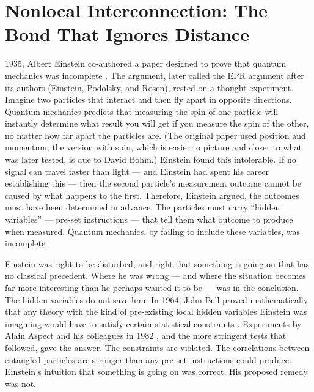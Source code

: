 \chapter[Nonlocal Interconnection]{Nonlocal Interconnection: The Bond That Ignores Distance}
\label{ch:nonlocal-interconnection}


 1935, Albert Einstein co-authored a paper designed to prove that quantum mechanics was incomplete \citep{Einstein1935EPR}. The argument, later called the EPR argument after its authors (Einstein, Podolsky, and Rosen), rested on a thought experiment. Imagine two particles that interact and then fly apart in opposite directions. Quantum mechanics predicts that measuring the spin of one particle will instantly determine what result you will get if you measure the spin of the other, no matter how far apart the particles are. (The original paper used position and momentum; the version with spin, which is easier to picture and closer to what was later tested, is due to David Bohm.) Einstein found this intolerable. If no signal can travel faster than light --- and Einstein had spent his career establishing this --- then the second particle's measurement outcome cannot be caused by what happens to the first. Therefore, Einstein argued, the outcomes must have been determined in advance. The particles must carry ``hidden variables'' --- pre-set instructions --- that tell them what outcome to produce when measured. Quantum mechanics, by failing to include these variables, was incomplete.

Einstein was right to be disturbed, and right that something is going on that has no classical precedent. Where he was wrong --- and where the situation becomes far more interesting than he perhaps wanted it to be --- was in the conclusion. The hidden variables do not save him. In 1964, John Bell proved mathematically that any theory with the kind of pre-existing local hidden variables Einstein was imagining would have to satisfy certain statistical constraints \citep{Bell1964}. Experiments by Alain Aspect and his colleagues in 1982 \citep{Aspect1982}, and the more stringent tests that followed, gave the answer. The constraints are violated. The correlations between entangled particles are stronger than any pre-set instructions could produce. Einstein's intuition that something is going on was correct. His proposed remedy was not.

